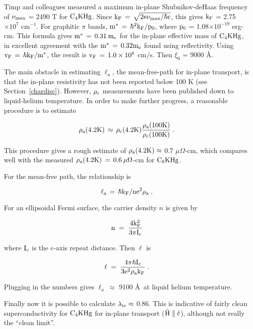         Timp and colleagues\cite{W179} measured a  maximum in-plane Shubnikov-deHaas
frequency of $\rm \nu_{max}$ = 2490 T for $\rm C_4KHg$.  Since  $\rm k_F \,
= \, \sqrt{2e  \nu_{max} / \hbar  c }$, this gives $\rm  k_F$ = 2.75$\times
10^7$ cm$^{-1}$.\cite{Z260}  For graphitic $\pi$ bands, $\rm m^* \, = \, \hbar^2 k_F /
p_0$,         where    $\rm p_0$          =         1.08$\times       10^{-19}$
erg-cm.\cite{sugihara87} This formula  gives  $\rm  m^*  \, = \,
0.31 \: m_{e}$ for the in-plane effective mass of $\rm C_4KHg$, in excellent  agreement with the  $\rm m^*
\, = \, 0.32 m_{e}$ found using reflectivity.\cite{yang88}  Using
$\rm v_F \, = \, \hbar k_F / m^*$,\cite{sugihara87} the  result is $\rm v_F
\, = \, 1.0\times 10^8$ cm/s.  Then $\xi_0$ = 9000 \AA.

        The main obstacle  in estimating $\ell_a$,  the  mean-free-path for
in-plane transport, is that the in-plane  resistivity has not been reported
below 100 K  (see Section~\ref{chardisc}).\cite{elmakrini80b} However, $\rm
\rho_c$ measurements     have  been   published   down   to   liquid-helium
temperature.\cite{fischer83}  In order to make further progress, a
reasonable procedure is to estimate 

\[\rm \rho_a(4.2K) \, \approx \, \rho_c(4.2K) \frac{\rho_a(100K)}{\rho_c(100K)} \; .\] 

\noindent This procedure gives  a rough estimate of $\rm \rho_a(4.2K) \approx$  0.7 $\mu
\Omega$-cm, which compares well with the measured $\rm \rho_a(4.2K) \, = \,
0.6 \: \mu\Omega$-cm for $\rm C_8KHg$.\cite{pendrys81}

        For the mean-free path, the relationship is

\[\rm \ell_a \,  = \, \hbar  k_F / n e^2 \rho_a \; . \]

\noindent  For an ellipsoidal Fermi surface, the carrier density $n$ is
given by

\[ \rm n \; = \; \frac{4k_F^2}{3 \pi I_c}
\]

\noindent where $\rm I_c$ is the c-axis repeat distance.\cite{Z260}  Then
$\ell$ is 

\[ \rm \ell \; = \; \frac{4 \pi \hbar I_c}{3 e^2 \rho_a k_F} \; .
\]

\noindent  Plugging in the numbers gives $\ell_a \: \approx$ 9100 \AA\ at
liquid helium temperature.

        Finally now it is possible to calculate  $\rm \lambda_{tr} \approx$
0.86.   This is  indicative of  fairly   clean  superconductivity for  $\rm
C_4KHg$ for in-plane transport ($\rm \vec{H} \parallel  \hat{c}$), although
not really the ``clean limit''.

